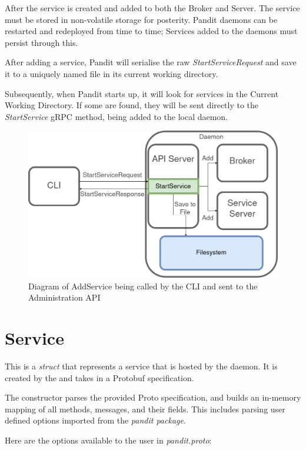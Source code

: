 \documentclass[a4paper,12pt]{report}
\begin{document}
After the service is created and added to both the Broker and Server. The service must be stored in non-volatile storage for posterity.
Pandit daemons can be restarted and redeployed from time to time; Services added to the daemons must persist through this.

After adding a service, Pandit will serialise the raw \textit{StartServiceRequest} and save it to a uniquely named file in its current working directory.

Subsequently, when Pandit starts up, it will look for services in the Current Working Directory. If some are found, they will be sent directly to the \textit{StartService} gRPC method, being added to the local daemon.

\begin{figure}[hbt!]
    \centering
    \includegraphics[width=\linewidth]{admin.png}
    \caption{Diagram of AddService being called by the CLI and sent to the Administration API}
    \label{fig:admin}
\end{figure}

\section{Service}
\label{sec:service}
This is a \textit{struct} that represents a service that is hosted by the daemon. It is created by the \textit{} and
takes in a Protobuf specification.

The constructor parses the provided Proto specification, and builds an in-memory mapping of all methods, messages, and their fields.
This includes parsing user defined options imported from the \textit{pandit package}.

Here are the options available to the user in \textit{pandit.proto}:
\end{document}
